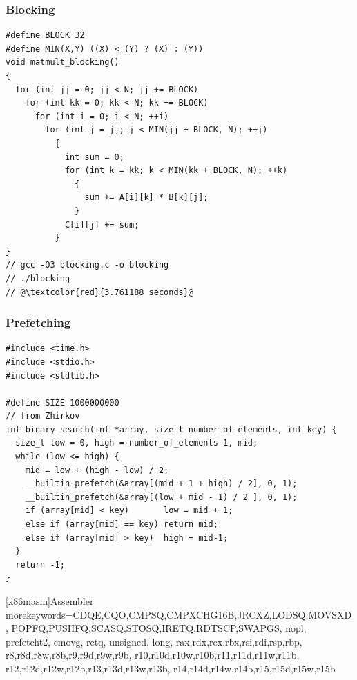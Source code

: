 \documentclass{beamer}
\begin{document}
\begin{frame}[fragile]
\frametitle{Blocking}
\scriptsize

\begin{lstlisting}
#define BLOCK 32
#define MIN(X,Y) ((X) < (Y) ? (X) : (Y))
void matmult_blocking()
{
  for (int jj = 0; jj < N; jj += BLOCK)
    for (int kk = 0; kk < N; kk += BLOCK)
      for (int i = 0; i < N; ++i)
        for (int j = jj; j < MIN(jj + BLOCK, N); ++j)
          {
            int sum = 0;
            for (int k = kk; k < MIN(kk + BLOCK, N); ++k)
              {
                sum += A[i][k] * B[k][j];
              }
            C[i][j] += sum;
          }
}
// gcc -O3 blocking.c -o blocking
// ./blocking
// @\textcolor{red}{3.761188 seconds}@
\end{lstlisting}

\end{frame}

\begin{frame}[fragile]
\frametitle{Prefetching}
\scriptsize

\begin{lstlisting}[linebackgroundcolor={\lstcolorlines{11,12}}]
#include <time.h>
#include <stdio.h>
#include <stdlib.h>

#define SIZE 1000000000
// from Zhirkov
int binary_search(int *array, size_t number_of_elements, int key) {
  size_t low = 0, high = number_of_elements-1, mid;
  while (low <= high) {
    mid = low + (high - low) / 2;
    __builtin_prefetch(&array[(mid + 1 + high) / 2], 0, 1);
    __builtin_prefetch(&array[(low + mid - 1) / 2 ], 0, 1);
    if (array[mid] < key)       low = mid + 1;
    else if (array[mid] == key) return mid;
    else if (array[mid] > key)  high = mid-1;
  }
  return -1;
}
\end{lstlisting}

\end{frame}

   [x86masm]{Assembler} %
   {morekeywords={CDQE,CQO,CMPSQ,CMPXCHG16B,JRCXZ,LODSQ,MOVSXD, %
       POPFQ,PUSHFQ,SCASQ,STOSQ,IRETQ,RDTSCP,SWAPGS, %
       nopl, prefetcht2, cmovg, retq, unsigned, long,
       rax,rdx,rcx,rbx,rsi,rdi,rsp,rbp, %
       r8,r8d,r8w,r8b,r9,r9d,r9w,r9b, %
       r10,r10d,r10w,r10b,r11,r11d,r11w,r11b, %
       r12,r12d,r12w,r12b,r13,r13d,r13w,r13b, %
       r14,r14d,r14w,r14b,r15,r15d,r15w,r15b}} %

\lstset{language=[x64]Assembler}
\end{document}
